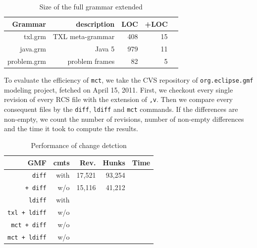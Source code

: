 \documentclass[10pt, conference, compsocconf]{IEEEtran}
\begin{document}
\begin{table}
\caption{Size of the full grammar extended\label{table:2}}
\begin{tabular}{| r || r | r | r | r | }\hline
{\bf Grammar} & description & LOC & +LOC \\  \hline\hline
txl.grm & TXL meta-grammar & 408 & 15 \\ \hline
java.grm & Java 5 &  979 &  11 \\ \hline
problem.grm &  problem frames & 82 & 5 \\ \hline
\hline\end{tabular}
\end{table}

To evaluate the efficiency of {\tt mct}, we take the CVS repository of {\tt org.eclipse.gmf} modeling project, fetched on April 15, 2011. First, we checkout every single revision of every RCS file with the extension of {\tt ,v}. Then we compare every consequent files by the {\tt diff}, {\tt ldiff} and {\tt mct} commands. If the differences are non-empty, we count the number of revisions,  number of non-empty differences and the time it took to compute the results.
\begin{table}\centering
\caption{Performance of change detction\label{table:2}}
\begin{tabular}{| r || r | r | r | r ||}\hline
{\bf GMF} &  {\bf cmts} & {\bf Rev.} & {\bf Hunks} & {\bf Time} \\\hline\hline
{\tt diff} & with & 17,521 & 93,254 & \\\hline
{\tt   + diff} & w/o & 15,116 & 41,212 & \\\hline
{\tt ldiff} & with &  & & \\\hline
{\tt txl + ldiff} & w/o  &  & & \\\hline
{\tt mct + diff} &w/o  & & & \\\hline
{\tt mct + ldiff} &w/o  & & & \\\hline
\hline\end{tabular}
\end{table}
\end{document}
